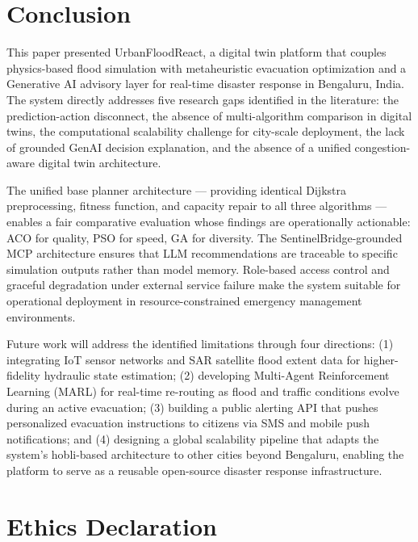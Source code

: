 \documentclass[journal]{IEEEtran}
\begin{document}
\section{Conclusion}
\label{sec:conclusion}

This paper presented UrbanFloodReact, a digital twin platform that couples physics-based
flood simulation with metaheuristic evacuation optimization and a Generative AI advisory
layer for real-time disaster response in Bengaluru, India. The system directly addresses
five research gaps identified in the literature: the prediction-action disconnect, the
absence of multi-algorithm comparison in digital twins, the computational scalability
challenge for city-scale deployment, the lack of grounded GenAI decision explanation, and
the absence of a unified congestion-aware digital twin architecture.

The unified base planner architecture — providing identical Dijkstra preprocessing, fitness
function, and capacity repair to all three algorithms — enables a fair comparative evaluation
whose findings are operationally actionable: ACO for quality, PSO for speed, GA for
diversity. The SentinelBridge-grounded MCP architecture ensures that LLM recommendations
are traceable to specific simulation outputs rather than model memory. Role-based access
control and graceful degradation under external service failure make the system suitable for
operational deployment in resource-constrained emergency management environments.

Future work will address the identified limitations through four directions: (1) integrating
IoT sensor networks and SAR satellite flood extent data for higher-fidelity hydraulic state
estimation; (2) developing Multi-Agent Reinforcement Learning (MARL) for real-time
re-routing as flood and traffic conditions evolve during an active evacuation; (3) building
a public alerting API that pushes personalized evacuation instructions to citizens via SMS
and mobile push notifications; and (4) designing a global scalability pipeline that adapts
the system's hobli-based architecture to other cities beyond Bengaluru, enabling the
platform to serve as a reusable open-source disaster response infrastructure.

\section*{Ethics Declaration}
\end{document}
